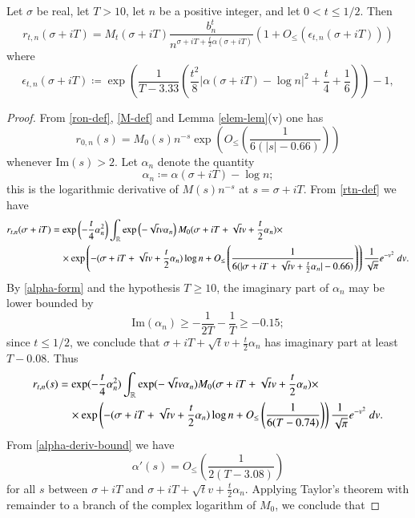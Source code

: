\begin{proposition}  Let $\sigma$ be real, let $T>10$, let $n$ be a positive integer, and let $0 < t \leq 1/2$.  Then 
$$ r_{t,n}(\sigma+iT) = M_t(\sigma+iT) \frac{b_n^t}{n^{\sigma+iT+\frac{t}{2} \alpha(\sigma+iT)}} \left(1 + O_{\leq}(\epsilon_{t,n}(\sigma+iT))\right)$$
where
$$ \epsilon_{t,n}(\sigma+iT) \coloneqq \exp\left( \frac{1}{T-3.33} \left(\frac{t^2}{8} |\alpha(\sigma+iT) - \log n|^2 + \frac{t}{4} + \frac{1}{6}\right)\right)-1,$$
\end{proposition}

\begin{proof}  From \eqref{ron-def}, \eqref{M-def} and Lemma \ref{elem-lem}(v) one has
$$ 
r_{0,n}(s) = M_0(s) n^{-s} \exp\left( O_{\leq}\left( \frac{1}{6(|s|-0.66)} \right) \right)
$$
whenever $\mathrm{Im}(s) > 2$.  Let $\alpha_n$ denote the quantity
\begin{equation}\label{alphan-def}
\alpha_n \coloneqq \alpha(\sigma+iT) - \log n;
\end{equation}
this is the logarithmic derivative of $M(s) n^{-s}$ at $s=\sigma+iT$.  From \eqref{rtn-def} we have
\begin{align*}
 r_{t,n}(\sigma+iT) &= \exp\left( - \frac{t}{4} \alpha_n^2\right) \int_{\mathbb{R}} \exp\left( - \sqrt{t} v \alpha_n\right) M_0( \sigma + iT + \sqrt{t} v + \frac{t}{2} \alpha_n) \times \\
&\quad \times \exp\left( -(\sigma+iT+\sqrt{t} v + \frac{t}{2} \alpha_n ) \log n + O_{\leq}\left( \frac{1}{6(|\sigma+iT+\sqrt{t} v + \frac{t}{2} \alpha_n|-0.66)} \right) \right)
\frac{1}{\sqrt{\pi}} e^{-v^2}\ dv.
\end{align*}
By \eqref{alpha-form} and the hypothesis $T \geq 10$, the imaginary part of $\alpha_n$ may be lower bounded by
$$ \mathrm{Im}(\alpha_n) \geq -\frac{1}{2T} - \frac{1}{T} \geq -0.15;$$
since $t \leq 1/2$, we conclude that $\sigma+iT+\sqrt{t} v + \frac{t}{2} \alpha_n$ has imaginary part at least $T - 0.08$.  Thus
\begin{align*}
 r_{t,n}(s) &= \exp( - \frac{t}{4} \alpha_n^2) \int_{\mathbb{R}} \exp( - \sqrt{t} v \alpha_n) M_0( \sigma + iT + \sqrt{t} v + \frac{t}{2} \alpha_n) \times
\\
&\quad \times \exp\left( -(\sigma+iT+\sqrt{t} v + \frac{t}{2} \alpha_n ) \log n + O_{\leq}\left( \frac{1}{6(T - 0.74)} \right) \right)
\frac{1}{\sqrt{\pi}} e^{-v^2}\ dv.
\end{align*}
From \eqref{alpha-deriv-bound} we have
$$ \alpha'(s) = O_{\leq}\left( \frac{1}{2(T-3.08)} \right)$$
for all $s$ between $\sigma+iT$ and $\sigma + iT + \sqrt{t} v + \frac{t}{2} \alpha_n$.  Applying Taylor's theorem with remainder to a branch of the complex logarithm of $M_0$, we conclude that

\end{proof}
